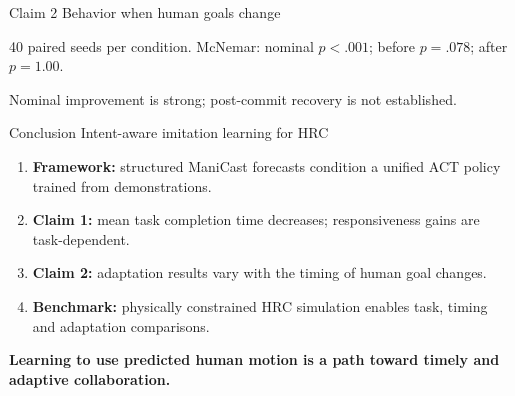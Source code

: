 \documentclass[11pt]{beamer}
\newcommand{\keyidea}[1]{\vspace{0.12cm}\begin{center}\small\color{HN}\bfseries #1\end{center}}
\begin{document}
\begin{frame}{Claim 2 \hfill Behavior when human goals change}
\centering
{}
\vspace{.13cm}
\begin{center}\scriptsize
40 paired seeds per condition. McNemar: nominal $p<.001$; before $p=.078$; after $p=1.00$.
\end{center}
\vspace{.12cm}
\begin{center}\small
Nominal improvement is strong; post-commit recovery is not established.
\end{center}
\end{frame}

\begin{frame}{Conclusion \hfill Intent-aware imitation learning for HRC}
\vspace{.15cm}
\begin{enumerate}\setlength{\itemsep}{.34cm}
\item \textbf{Framework:} structured ManiCast forecasts condition a unified ACT policy trained from demonstrations.
\item \textbf{Claim 1:} mean task completion time decreases; responsiveness gains are task-dependent.
\item \textbf{Claim 2:} adaptation results vary with the timing of human goal changes.
\item \textbf{Benchmark:} physically constrained HRC simulation enables task, timing and adaptation comparisons.
\end{enumerate}
\vspace{.17cm}
\keyidea{Learning to use predicted human motion is a path toward timely and adaptive collaboration.}
\end{frame}
\end{document}
